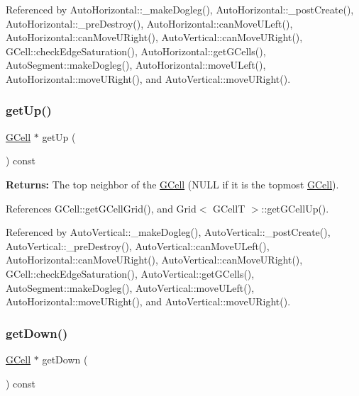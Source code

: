 Referenced by Auto\+Horizontal\+::\+\_\+make\+Dogleg(), Auto\+Horizontal\+::\+\_\+post\+Create(), Auto\+Horizontal\+::\+\_\+pre\+Destroy(), Auto\+Horizontal\+::can\+Move\+U\+Left(), Auto\+Horizontal\+::can\+Move\+U\+Right(), Auto\+Vertical\+::can\+Move\+U\+Right(), G\+Cell\+::check\+Edge\+Saturation(), Auto\+Horizontal\+::get\+G\+Cells(), Auto\+Segment\+::make\+Dogleg(), Auto\+Horizontal\+::move\+U\+Left(), Auto\+Horizontal\+::move\+U\+Right(), and Auto\+Vertical\+::move\+U\+Right().

\mbox{\label{classKatabatic_1_1GCell_a335506a314a2330b5a354906e798e60c}} 
\subsubsection{\texorpdfstring{get\+Up()}{getUp()}}
{\footnotesize\ttfamily \hyperlink{classKatabatic_1_1GCell}{G\+Cell} $\ast$ get\+Up (\begin{DoxyParamCaption}{ }\end{DoxyParamCaption}) const}

{\bfseries Returns\+:} The top neighbor of the \hyperlink{classKatabatic_1_1GCell}{G\+Cell} ({\ttfamily N\+U\+LL} if it is the topmost \hyperlink{classKatabatic_1_1GCell}{G\+Cell}). 

References G\+Cell\+::get\+G\+Cell\+Grid(), and Grid$<$ G\+Cell\+T $>$\+::get\+G\+Cell\+Up().



Referenced by Auto\+Vertical\+::\+\_\+make\+Dogleg(), Auto\+Vertical\+::\+\_\+post\+Create(), Auto\+Vertical\+::\+\_\+pre\+Destroy(), Auto\+Vertical\+::can\+Move\+U\+Left(), Auto\+Horizontal\+::can\+Move\+U\+Right(), Auto\+Vertical\+::can\+Move\+U\+Right(), G\+Cell\+::check\+Edge\+Saturation(), Auto\+Vertical\+::get\+G\+Cells(), Auto\+Segment\+::make\+Dogleg(), Auto\+Vertical\+::move\+U\+Left(), Auto\+Horizontal\+::move\+U\+Right(), and Auto\+Vertical\+::move\+U\+Right().

\mbox{\label{classKatabatic_1_1GCell_ae448c9d6d028e967d7bd5a1bfdd05311}} 
\subsubsection{\texorpdfstring{get\+Down()}{getDown()}}
{\footnotesize\ttfamily \hyperlink{classKatabatic_1_1GCell}{G\+Cell} $\ast$ get\+Down (\begin{DoxyParamCaption}{ }\end{DoxyParamCaption}) const}

